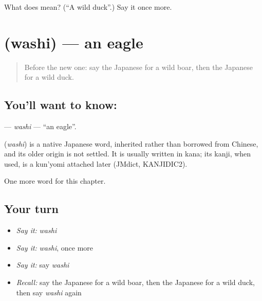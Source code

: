 \begin{tcolorbox}[breakable,colback=teal!4,colframe=teal!35!black,title={Before you move on}]
What does  mean? (\textquotedblleft{}A wild duck\textquotedblright{}.) Say it once more.
\end{tcolorbox}
\section[\texorpdfstring{\ja{わし} (washi)}{わし (washi)}]{ (washi) — an eagle}

\label{lesson:JA-C109-washi}



\begin{quote}
Before the new one: say the Japanese for a wild boar, then the Japanese for a wild duck.
\end{quote}

\subsection*{You'll want to know: }
\textbf{} — \emph{washi} — \textquotedblleft{}an eagle\textquotedblright{}.

\begin{cousinweb}
\textbf{} (\emph{washi}) is a native Japanese word, inherited rather than borrowed from Chinese, and its older origin is not settled. It is usually written in kana; its kanji, when used, is a kun'yomi attached later (JMdict, KANJIDIC2).
\end{cousinweb}

\begin{grammarlens}[title={What you've built}]
One more word for this chapter.
\end{grammarlens}

\subsection*{Your turn}
\begin{itemize}
\raggedright
  \item \emph{Say it:} \emph{washi}
  \item \emph{Say it:} \emph{washi}, once more
  \item \emph{Say it:} say \emph{washi}
  \item \emph{Recall:} say the Japanese for a wild boar, then the Japanese for a wild duck, then say \emph{washi} again
\end{itemize}

